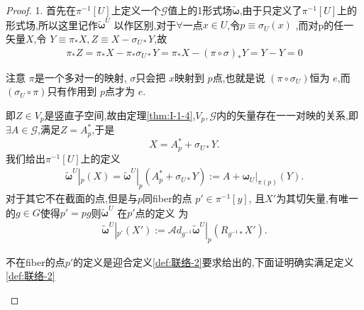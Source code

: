 \documentclass[../main.tex]{subfiles}
\begin{document}
\begin{proof}
1. 首先在$\pi^{-1}[U]$上定义一个$\mathscr{G}$值上的1形式场$ \bm{\tilde{\omega}} $,由于只定义了$\pi^{-1}[U]$上的形式场,所以这里记作$\bm{\tilde{\omega}}^U $ 以作区别,对于$\forall $一点$x \in U$,令$p \equiv \sigma_U(x)$
,而对p的任一矢量$X$,令 $Y \equiv \pi_* X, Z \equiv X - \sigma_{U*} Y$,故
\begin{align*}
  \pi_*Z = \pi_* X -  \pi_* \sigma_{U*} Y = \pi_* X - (\pi \circ \sigma)_* Y = Y - Y = 0
\end{align*}
\begin{note}
 注意 $\pi$是一个多对一的映射, $\sigma$只会把 $x$映射到 $p$点,也就是说 $(\pi \circ \sigma_U)$恒为 $e$,而 $(\sigma_U \circ \pi)$只有作用到 $p$点才为 $e$. 
\end{note}
即$Z \in V_p$是竖直子空间,故由定理\ref{thm:I-1-4},$V_p,\mathscr{G}$内的矢量存在一一对映的关系,即$\exists  A \in \mathscr{G}$,满足$Z = A^*_p$,于是 \[
  X = A^*_p + \sigma_{U*}Y
.\] 
我们给出$\pi^{-1}[U]$上的定义
\begin{align*}
  \bm{\tilde{\omega}}^U| _p(X) =  \bm{\tilde{\omega}}^U| _p(A^*_p + \sigma_{U*}Y) := A + \bm{\omega}_U |_{\pi(p)}(Y)  
.\end{align*}
对于其它不在截面的点,但是与$p$同fiber的点 $p' \in \pi^{-1}[y]$, 且$X'$为其切矢量,有唯一的$g\in G$使得$p' = pg$则$\bm{\tilde{\omega}}^U $ 在$p'$点的定义 为
\begin{align*}
  \bm{\tilde{\omega}}^U| _{p'}(X') := \mathscr{A}\!d_{g^{-1}}\bm{\tilde{\omega}}^U|_p(R_{g^{-1}*}X') 
.\end{align*}
\begin{note}
  不在fiber的点$p'$的定义是迎合定义\ref{def:联络-2}要求给出的,下面证明确实满足定义\ref{def:联络-2}
\end{note}


\end{proof}
\end{document}
